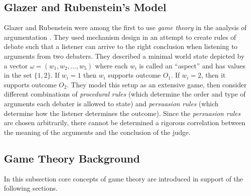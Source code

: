 \documentclass[12pt, a4paper]{article}
\begin{document}
\subsection{Glazer and Rubenstein's Model}

Glazer and Rubenstein were among the first to use \emph{game theory} in the
analysis of argumentation \cite{glazer2001debates}. They used mechanism design in an attempt
to create rules of debate such that a listener can arrive to the right
conclusion when listening to arguments from two debaters. They described a
minimal world state depicted by a vector $\omega=(w_1, w_2, \dots, w_5)$ where
each $w_i$ is called an ``aspect'' and has values in the set $\{1, 2\}$. If
$w_i=1$ then $w_i$ supports outcome $O_1$. If $w_i=2$, then it supports outcome
$O_2$. They model this setup as an extensive game, then consider different
combinations of \emph{procedural rules} (which determine the order and type of
arguments each debater is allowed to state) and \emph{persuasion rules} (which
determine how the listener determines the outcome). Since the \emph{persuasion
rules} are chosen arbitrarily, there cannot be determined a rigorous
correlation between the meaning of the arguments and the conclusion of 
the judge.

\subsection{Game Theory Background}

In this subsection core concepts of game theory are introduced in support of
the following sections.
\end{document}
